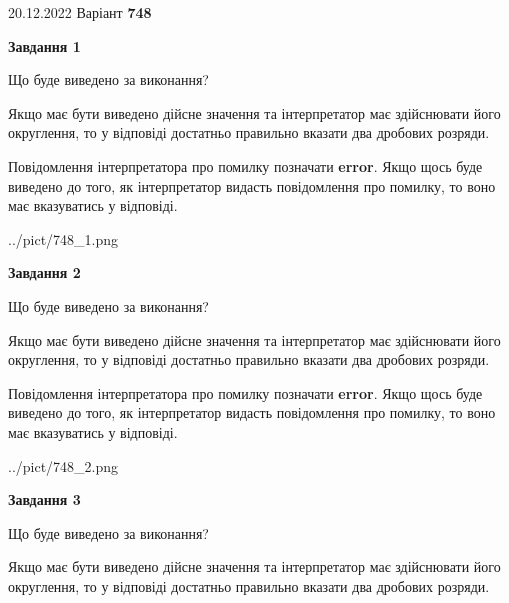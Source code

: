 \documentclass[12pt, ukrainian]{article}
\begin{document}
{20.12.2022 Варіант \No \textbf { 748 }\par}
{
\begin {Large}

{\begin {center}\textbf{Завдання 1}\end {center}}\par
Що буде виведено за виконання? \par

Якщо має бути виведено дійсне значення та інтерпретатор має здійснювати його округлення, 
то у відповіді достатньо правильно вказати два дробових розряди.

Повідомлення інтерпретатора про помилку позначати \textbf{error}.
Якщо щось буде виведено до того, як інтерпретатор видасть повідомлення про помилку, 
то воно має вказуватись у відповіді. \par

\begin{center}
	{../pict/748_1.png}
\end{center}
\newpage

{\begin {center}\textbf{Завдання 2}\end {center}}\par
Що буде виведено за виконання? \par

Якщо має бути виведено дійсне значення та інтерпретатор має здійснювати його округлення, 
то у відповіді достатньо правильно вказати два дробових розряди.

Повідомлення інтерпретатора про помилку позначати \textbf{error}.
Якщо щось буде виведено до того, як інтерпретатор видасть повідомлення про помилку, 
то воно має вказуватись у відповіді. \par

\begin{center}
	{../pict/748_2.png}
\end{center}
\newpage

{\begin {center}\textbf{Завдання 3}\end {center}}\par
Що буде виведено за виконання? \par

Якщо має бути виведено дійсне значення та інтерпретатор має здійснювати його округлення, 
то у відповіді достатньо правильно вказати два дробових розряди.


\end{Large}}
\end{document}
